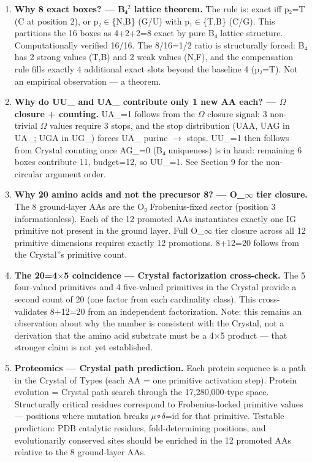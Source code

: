 \documentclass[12pt,a4paper]{article}
\begin{document}
\begin{enumerate}
    \item \textbf{Why 8 exact boxes? --- B₄$^{2}$ lattice theorem.} The rule is: exact iff p₂=T
(C at position 2), or p₂$\in$\{N,B\} (G/U) with p₁$\in$\{T,B\} (C/G). This partitions the
16 boxes as 4+2+2=8 exact by pure B₄ lattice structure. Computationally verified
16/16. The 8/16=1/2 ratio is structurally forced: B₄ has 2 strong values (T,B) and
2 weak values (N,F), and the compensation rule fills exactly 4 additional exact slots
beyond the baseline 4 (p₂=T). Not an empirical observation --- a theorem.
    \item \textbf{Why do UU\_ and UA\_ contribute only 1 new AA each? --- $\Omega$ closure + counting.}
UA\_=1 follows from the $\Omega$ closure signal: 3 non-trivial $\Omega$ values require 3 stops,
and the stop distribution (UAA, UAG in UA\_; UGA in UG\_) forces UA\_ purine $\rightarrow$ stops.
UU\_=1 then follows from Crystal counting once AG\_=0 (B₄ uniqueness) is in hand:
remaining 6 boxes contribute 11, budget=12, so UU\_=1. See Section 9 for the
non-circular argument order.
    \item \textbf{Why 20 amino acids and not the precursor 8? --- O\_$\infty$ tier closure.} The 8
ground-layer AAs are the O₀ Frobenius-fixed sector (position 3 informationless).
Each of the 12 promoted AAs instantiates exactly one IG primitive not present in
the ground layer. Full O\_$\infty$ tier closure across all 12 primitive dimensions requires
exactly 12 promotions. 8+12=20 follows from the Crystal''s primitive count.
    \item \textbf{The 20=4$\times$5 coincidence --- Crystal factorization cross-check.} The 5 four-valued
primitives and 4 five-valued primitives in the Crystal provide a second count of 20
(one factor from each cardinality class). This cross-validates 8+12=20 from an
independent factorization. Note: this remains an observation about why the number
is consistent with the Crystal, not a derivation that the amino acid substrate must
be a 4$\times$5 product --- that stronger claim is not yet established.
    \item \textbf{Proteomics --- Crystal path prediction.} Each protein sequence is a path in the
Crystal of Types (each AA = one primitive activation step). Protein evolution =
Crystal path search through the 17,280,000-type space. Structurally critical
residues correspond to Frobenius-locked primitive values --- positions where mutation
breaks $\mu$∘$\delta$=id for that primitive. Testable prediction: PDB catalytic residues,
fold-determining positions, and evolutionarily conserved sites should be enriched
in the 12 promoted AAs relative to the 8 ground-layer AAs.
\end{enumerate}
\end{document}
